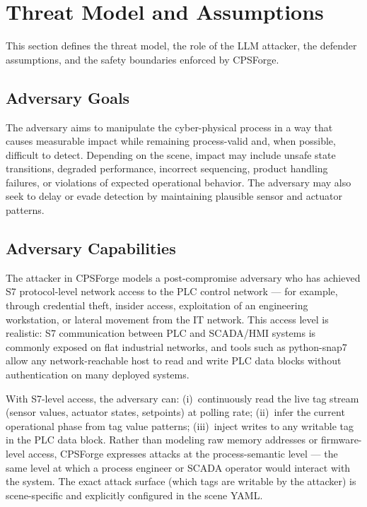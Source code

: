 \section{Threat Model and Assumptions}
\label{sec:threat}

This section defines the threat model, the role of the LLM attacker, the defender assumptions, and the safety boundaries enforced by CPSForge.

\subsection{Adversary Goals}

The adversary aims to manipulate the cyber-physical process in a way that causes measurable impact while remaining process-valid and, when possible, difficult to detect. Depending on the scene, impact may include unsafe state transitions, degraded performance, incorrect sequencing, product handling failures, or violations of expected operational behavior. The adversary may also seek to delay or evade detection by maintaining plausible sensor and actuator patterns.

\subsection{Adversary Capabilities}

The attacker in CPSForge models a post-compromise adversary who has achieved S7 protocol-level network access to the PLC control network --- for example, through credential theft, insider access, exploitation of an engineering workstation, or lateral movement from the IT network. This access level is realistic: S7 communication between PLC and SCADA/HMI systems is commonly exposed on flat industrial networks, and tools such as python-snap7 allow any network-reachable host to read and write PLC data blocks without authentication on many deployed systems.

With S7-level access, the adversary can: (i)~continuously read the live tag stream (sensor values, actuator states, setpoints) at polling rate; (ii)~infer the current operational phase from tag value patterns; (iii)~inject writes to any writable tag in the PLC data block. Rather than modeling raw memory addresses or firmware-level access, CPSForge expresses attacks at the process-semantic level --- the same level at which a process engineer or SCADA operator would interact with the system. The exact attack surface (which tags are writable by the attacker) is scene-specific and explicitly configured in the scene YAML.

